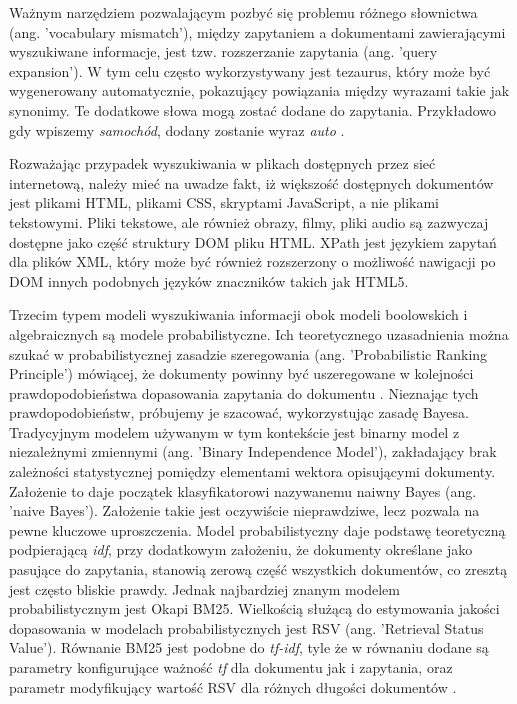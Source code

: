 Ważnym narzędziem pozwalającym pozbyć się problemu różnego słownictwa (ang.
'vocabulary mismatch'), między zapytaniem a dokumentami zawierającymi wyszukiwane informacje,
jest tzw. rozszerzanie zapytania (ang. 'query expansion'). W tym celu często wykorzystywany jest
tezaurus, który może być wygenerowany automatycznie, pokazujący powiązania między wyrazami takie jak synonimy. Te dodatkowe słowa mogą zostać dodane do zapytania. Przykładowo gdy
wpiszemy {\it samochód}, dodany zostanie wyraz {\it auto} \autocite{introtoinformationretrieval}.\newline

Rozważając przypadek wyszukiwania w plikach dostępnych przez sieć internetową, należy
mieć na uwadze fakt, iż większość dostępnych dokumentów jest plikami HTML, plikami CSS, skryptami
JavaScript, a nie plikami tekstowymi. Pliki tekstowe, ale również obrazy, filmy, pliki audio są zazwyczaj
dostępne jako część struktury DOM pliku HTML. XPath jest językiem zapytań dla plików XML, który
może być również rozszerzony o możliwość nawigacji po DOM innych podobnych języków znaczników takich jak HTML5. \newline

Trzecim typem modeli wyszukiwania informacji obok modeli boolowskich i algebraicznych są
modele probabilistyczne. Ich teoretycznego uzasadnienia można szukać w probabilistycznej zasadzie
szeregowania (ang. 'Probabilistic Ranking Principle') mówiącej, że dokumenty powinny być
uszeregowane w kolejności prawdopodobieństwa dopasowania zapytania do dokumentu \autocite{robertson1977}. Nieznając tych prawdopodobieństw, próbujemy je szacować, wykorzystując zasadę Bayesa. Tradycyjnym modelem używanym w tym kontekście jest binarny model z niezależnymi zmiennymi (ang. 'Binary Independence Model'),
zakładający brak zależności statystycznej pomiędzy elementami wektora opisującymi dokumenty.
Założenie to daje początek klasyfikatorowi nazywanemu naiwny Bayes (ang. 'naive Bayes'). Założenie
takie jest oczywiście nieprawdziwe, lecz pozwala na pewne kluczowe uproszczenia. Model
probabilistyczny daje podstawę teoretyczną podpierającą {\it idf}, przy dodatkowym założeniu, że
dokumenty określane jako pasujące do zapytania, stanowią zerową część wszystkich dokumentów, co
zresztą jest często bliskie prawdy. Jednak najbardziej znanym modelem probabilistycznym jest Okapi
BM25. Wielkością służącą do estymowania jakości dopasowania w modelach probabilistycznych jest
RSV (ang. 'Retrieval Status Value'). Równanie BM25 jest podobne do {\it tf-idf}, tyle że w równaniu dodane
są parametry konfigurujące ważność {\it tf} dla dokumentu jak i zapytania, oraz parametr modyfikujący
wartość RSV dla różnych długości dokumentów \autocite{introtoinformationretrieval}.

